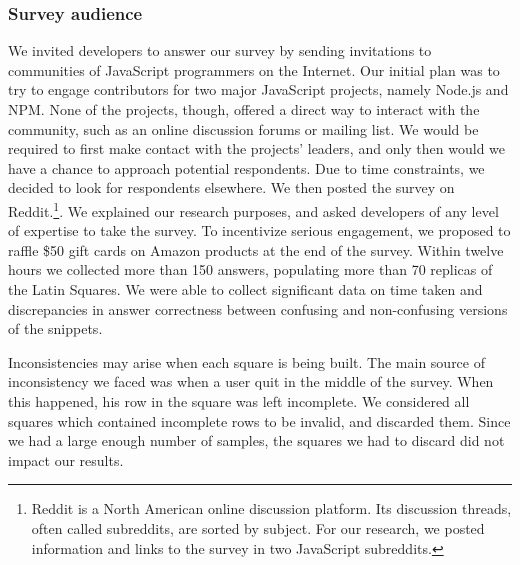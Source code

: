 \subsubsection{Survey audience}

{\color{blue}We invited developers to answer our survey by sending invitations to communities of JavaScript programmers on the Internet. Our initial plan was to try to engage contributors for two major JavaScript projects, namely Node.js and NPM. None of the projects, though, offered a direct way to interact with the community, such as an online discussion forums or mailing list. We would be required to first make contact with the projects' leaders, and only then would we have a chance to approach potential respondents. Due to time constraints, we decided to look for respondents elsewhere.}
We then posted the survey on Reddit.\footnote{Reddit is a North American online discussion platform. Its discussion threads, often called subreddits, are sorted by subject. For our research, we posted information and links to the survey in two JavaScript subreddits.}. We explained our research purposes, and asked developers of any level of expertise to take the survey. To incentivize serious engagement, we proposed to raffle \$50 gift cards on Amazon products at the end of the survey. Within twelve hours we collected more than 150 answers, populating more than 70 replicas of the Latin Squares. We were able to collect significant data on time taken and discrepancies in answer correctness between confusing and non-confusing versions of the snippets. 
    

Inconsistencies may arise when each square is being built. The main source of inconsistency we faced was when a user quit in the middle of the survey. When this happened, his row in the square was left incomplete. We considered all squares which contained incomplete rows to be invalid, and discarded them. Since we had a large enough number of samples, the squares we had to discard did not impact our results.
    
    

